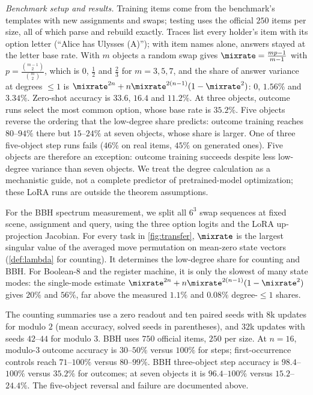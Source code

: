 \noindent\begin{minipage}{\linewidth}
\emph{Benchmark setup and results.} Training items come from the benchmark's templates with new assignments and swaps; testing uses
the official $250$ items per size, all of which parse and rebuild exactly. Traces list every holder's item with its
option letter (``Alice has Ulysses (A)''); with item names alone, answers stayed at the letter base rate. With $m$
objects a random swap gives $\mixrate=\frac{mp-1}{m-1}$ with $p=\frac{\binom{m-1}{2}}{\binom{m}{2}}$, which is $0$, $\tfrac{1}{2}$ and $\tfrac{2}{3}$ for $m=3,5,7$, and the
share of answer variance at degrees $\le1$ is $\mixrate^{2n}+n\mixrate^{2(n-1)}(1-\mixrate^2)$: $0$, $1.56\%$ and $3.34\%$. Zero-shot accuracy is
$33.6$, $16.4$ and $11.2\%$. At three objects, outcome runs select the most common option, whose base rate is $35.2\%$.
Five objects reverse the ordering that the low-degree share predicts: outcome training reaches $80$--$94\%$ there but
$15$--$24\%$ at seven objects, whose share is larger. One of three five-object step runs fails ($46\%$ on real items, $45\%$ on
generated ones). Five objects are therefore an exception: outcome training succeeds despite less low-degree variance than seven objects.
We treat the degree calculation as a mechanistic guide, not a complete predictor of pretrained-model optimization; these LoRA runs are outside the theorem assumptions.
\end{minipage}






For the BBH spectrum measurement, we split all $6^3$ swap sequences at fixed scene, assignment and query, using the three option
logits and the LoRA up-projection Jacobian. For every task in \cref{fig:transfer}, $\mixrate$ is the largest singular value of the averaged
move permutation on mean-zero state vectors (\cref{def:lambda} for counting).
It determines the low-degree share for counting and BBH. For Boolean-8 and the register machine, it is only the slowest of many state modes:
the single-mode estimate $\mixrate^{2n}+n\mixrate^{2(n-1)}(1-\mixrate^2)$ gives $20\%$ and $56\%$, far above the measured
$1.1\%$ and $0.08\%$ degree-$\le1$ shares.

The counting summaries use a zero readout and ten paired seeds with $8$k updates for modulo $2$ (mean accuracy, solved seeds in parentheses),
and $32$k updates with seeds $42$--$44$ for modulo $3$. BBH uses $750$ official items, $250$ per size. At $n=16$, modulo-$3$
outcome accuracy is $30$--$50\%$ versus $100\%$ for steps; first-occurrence controls
reach $71$--$100\%$ versus $80$--$99\%$. BBH three-object step accuracy is
$98.4$--$100\%$ versus $35.2\%$ for outcomes; at seven objects it is
$96.4$--$100\%$ versus $15.2$--$24.4\%$. The five-object reversal and failure
are documented above.



